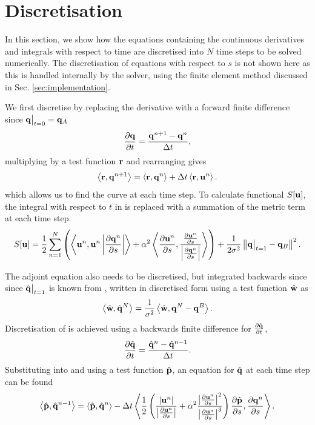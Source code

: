 \documentclass[a4paper, 12pt]{article}
\begin{document}
\section{Discretisation\label{sec:disc}}

In this section, we show how the equations containing the continuous derivatives
and integrals with respect to time are discretised into $N$ time steps to be
solved numerically. The discretisation of equations with respect to $s$ is not
shown here as this is handled internally by the solver, using the finite
element method discussed in Sec. \ref{sec:implementation}.

We first discretise  by replacing the derivative with a forward finite
difference since $\mathbf{q}\big|_{t=0} = \mathbf{q}_{A}$
\begin{equation}
  \label{eq:disc_dqdt}
  \frac{\partial \mathbf{q}}{\partial t} = \frac{\mathbf{q}^{n+1} - \mathbf{q}^n}{\Delta t},
\end{equation}
multiplying by a test function $\mathbf{r}$ and rearranging gives
\begin{equation}
  \label{eq:disc_q}
  \left\langle \mathbf{r}, \mathbf{q}^{n+1} \right\rangle = \left\langle \mathbf{r}, \mathbf{q}^n \right\rangle + \Delta t
    \left\langle \mathbf{r}, \mathbf{u}^n \right\rangle.
\end{equation}
which allows us to find the curve at each time step. To calculate functional
$S[\mathbf{u}]$, the integral with respect to $t$ in  is replaced with a
summation of the metric term at each time step.
\begin{equation}
  \label{eq:S_disc}
  S[\mathbf{u}] = \frac{1}{2} \displaystyle \sum_{n=1}^N   \left( 
    \left\langle \mathbf{u}^n, \mathbf{u}^n \left| \frac{\partial \mathbf{q}^n}{\partial s} \right| \right\rangle  + 
  \alpha^2 
  \left\langle \frac{\partial \mathbf{u}^n}{\partial s}, 
    \frac{\frac{\partial \mathbf{u}^n}{\partial s}}{\left|\frac{\partial \mathbf{q}^n}{\partial s}\right|} \right\rangle\right)
  + \frac{1}{2\sigma^2}\left\Vert \mathbf{q}\big|_{t=1} - \mathbf{q}_B\right\Vert^2.
\end{equation}

The adjoint equation also needs to be discretised, but integrated
backwards since  since $\hat{\mathbf{q}}\big|_{t=1}$ is known from , written in discretised form using a
test function $\hat{\mathbf{w}}$ as
\begin{equation}
  \label{eq:qht1_disc}
  \left\langle \hat{\mathbf{w}}, \hat{\mathbf{q}}^N \right\rangle = \frac{1}{\sigma^2}\left\langle \hat{\mathbf{w}}, \mathbf{q}^N
    - \mathbf{q}^B \right\rangle.
\end{equation}
Discretisation of  is achieved
using a backwards finite difference for $\frac{\partial \hat{\mathbf{q}}}{\partial t}$, 
\begin{equation}
  \label{eq:disc_dqhdt}
  \frac{\partial \hat{\mathbf{q}}}{\partial t} = \frac{\hat{\mathbf{q}}^{n} - \hat{\mathbf{q}}^{n-1}}{\Delta t}.
\end{equation}
Substituting  into  and using a test function $\hat{\mathbf{p}}$, an equation for $\hat{\mathbf{q}}$ at each time step can be found
\begin{equation}
  \label{eq:disc_qh}
  \left\langle \hat{\mathbf{p}}, \hat{\mathbf{q}}^{n-1} \right\rangle = \left\langle \hat{\mathbf{p}}, \hat{\mathbf{q}}^{n} \right\rangle - 
  \Delta t\left\langle \frac{1}{2}\left(\frac{\left|\mathbf{u}^n\right|}{\left|\frac{\partial \mathbf{u}^n}{\partial s}\right|} + \alpha^2\frac{\left|\frac{\partial \mathbf{u}^n}{\partial s}\right|^2}{\left|\frac{\partial \mathbf{u}^n}{\partial s}\right|^3}\right)
    \frac{\partial \hat{\mathbf{p}}}{\partial s}, \frac{\partial \mathbf{q}^n}{\partial s} \right\rangle.
  \end{equation}
\end{document}
